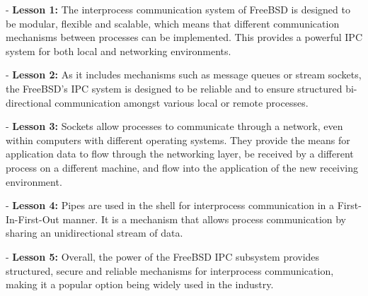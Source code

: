 \documentclass[12pt, dvipsnames, a4paper]{article}
\begin{document}
- \textbf{Lesson 1:} The interprocess communication system of FreeBSD is designed to be modular, flexible and scalable, which means that different communication mechanisms between processes can be implemented. This provides a powerful IPC system  for both local and networking environments.

- \textbf{Lesson 2:} As it includes mechanisms such as message queues or stream sockets, the FreeBSD’s IPC system is designed to be reliable and to ensure structured bi-directional communication amongst various local or remote processes.

- \textbf{Lesson 3:} Sockets allow processes to communicate through a network, even within computers with different operating systems. They provide the means for application data to flow through the networking layer, be received by a different process on a different machine, and flow into the application of the new receiving environment. 

- \textbf{Lesson 4:} Pipes are used in the shell for interprocess communication in a First-In-First-Out manner. It is a mechanism that allows process communication by sharing an unidirectional stream of data. 

- \textbf{Lesson 5:} Overall, the power of the FreeBSD IPC subsystem provides structured, secure and reliable mechanisms for interprocess communication, making it a popular option being widely used in the industry.
\end{document}
